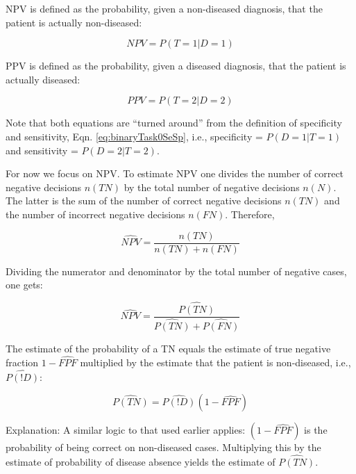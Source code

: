 \documentclass[
]{book}
\begin{document}
NPV is defined as the probability, given a non-diseased diagnosis, that the patient is actually non-diseased:

\begin{equation} 
NPV = P(T=1|D=1)
\label{eq:binaryTask0NPV1}
\end{equation}

PPV is defined as the probability, given a diseased diagnosis, that the patient is actually diseased:

\begin{equation} 
PPV = P(T=2|D=2)
\label{eq:binaryTask0PPV1}
\end{equation}

Note that both equations are ``turned around'' from the definition of specificity and sensitivity, Eqn. \eqref{eq:binaryTask0SeSp}, i.e., specificity = \(P(D=1|T=1)\) and sensitivity = \(P(D=2|T=2)\).

For now we focus on NPV. To estimate NPV one divides the number of correct negative decisions \(n(TN)\) by the total number of negative decisions \(n(N)\). The latter is the sum of the number of correct negative decisions \(n(TN)\) and the number of incorrect negative decisions \(n(FN)\). Therefore,

\begin{equation} 
\widehat{NPV}=\frac{n(TN)}{n(TN)+n(FN)}
\label{eq:binaryTask0NPV2}
\end{equation}

Dividing the numerator and denominator by the total number of negative cases, one gets:

\begin{equation} 
\widehat{NPV}=\frac{\widehat{P(TN)}}{\widehat{P(TN)}+\widehat{P(FN)}}
\label{eq:binaryTask0NPV3}
\end{equation}

The estimate of the probability of a TN equals the estimate of true negative fraction \(1-\widehat{FPF}\) multiplied by the estimate that the patient is non-diseased, i.e., \(\widehat{P(!D)}\):

\begin{equation} 
\widehat{P(TN)}=\widehat{P(!D)}(1-\widehat{FPF})
\label{eq:binaryTask0PTNEst}
\end{equation}

Explanation: A similar logic to that used earlier applies: \((1-\widehat{FPF})\) is the probability of being correct on non-diseased cases. Multiplying this by the estimate of probability of disease absence yields the estimate of \(\widehat{P(TN)}\).
\end{document}
